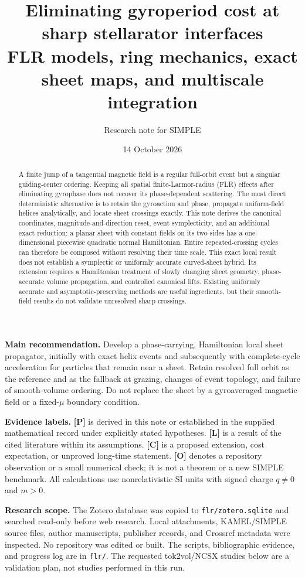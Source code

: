 \documentclass[10pt,a4paper]{article}
\title{Eliminating gyroperiod cost at sharp stellarator interfaces\\\large FLR models, ring mechanics, exact sheet maps, and multiscale integration}
\author{Research note for SIMPLE}
\date{14 October 2026}
\newcommand{\proved}{\textbf{[P]}}
\newcommand{\lit}{\textbf{[L]}}
\newcommand{\conj}{\textbf{[C]}}
\newcommand{\obs}{\textbf{[O]}}
\newcommand{\pathref}[1]{\texttt{\nolinkurl{#1}}}
\begin{document}
\maketitle
\begin{abstract}
A finite jump of a tangential magnetic field is a regular full-orbit event but a singular guiding-center ordering. Keeping all spatial finite-Larmor-radius (FLR) effects after eliminating gyrophase does not recover its phase-dependent scattering. The most direct deterministic alternative is to retain the gyroaction and phase, propagate uniform-field helices analytically, and locate sheet crossings exactly. This note derives the canonical coordinates, magnitude-and-direction reset, event symplecticity, and an additional exact reduction: a planar sheet with constant fields on its two sides has a one-dimensional piecewise quadratic normal Hamiltonian. Entire repeated-crossing cycles can therefore be composed without resolving their time scale. This exact local result does not establish a symplectic or uniformly accurate curved-sheet hybrid. Its extension requires a Hamiltonian treatment of slowly changing sheet geometry, phase-accurate volume propagation, and controlled canonical lifts. Existing uniformly accurate and asymptotic-preserving methods are useful ingredients, but their smooth-field results do not validate unresolved sharp crossings.
\end{abstract}

\textbf{Main recommendation.} Develop a phase-carrying, Hamiltonian local sheet propagator, initially with exact helix events and subsequently with complete-cycle acceleration for particles that remain near a sheet. Retain resolved full orbit as the reference and as the fallback at grazing, changes of event topology, and failure of smooth-volume ordering. Do not replace the sheet by a gyroaveraged magnetic field or a fixed-$\mu$ boundary condition.

\textbf{Evidence labels.} \proved{} is derived in this note or established in the supplied mathematical record under explicitly stated hypotheses. \lit{} is a result of the cited literature within its assumptions. \conj{} is a proposed extension, cost expectation, or unproved long-time statement. \obs{} denotes a repository observation or a small numerical check; it is not a theorem or a new SIMPLE benchmark. All calculations use nonrelativistic SI units with signed charge $q\ne0$ and $m>0$.

\textbf{Research scope.} The Zotero database was copied to \pathref{flr/zotero.sqlite} and searched read-only before web research. Local attachments, KAMEL/SIMPLE source files, author manuscripts, publisher records, and Crossref metadata were inspected. No repository was edited or built. The scripts, bibliographic evidence, and progress log are in \pathref{flr/}. The requested tok2vol/NCSX studies below are a validation plan, not studies performed in this run.
\end{document}
